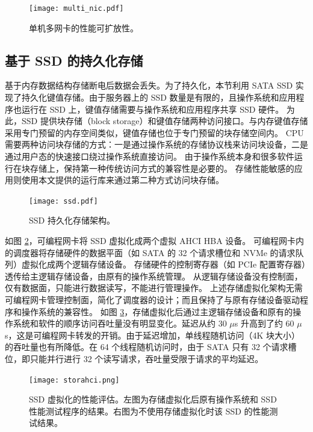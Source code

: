 \begin{figure}[htbp]
	\centering
	\texttt{[image: multi\_nic.pdf]}
	\caption{单机多网卡的性能可扩放性。}
	\label{kvdirect:fig:multiple-nics}
\end{figure}


\subsection{基于 SSD 的持久化存储}

基于内存数据结构存储断电后数据会丢失。为了持久化，本节利用 SATA SSD 实现了持久化键值存储。由于服务器上的 SSD 数量是有限的，且操作系统和应用程序也运行在 SSD 上，键值存储需要与操作系统和应用程序共享 SSD 硬件。
为此，SSD 提供块存储（block storage）和键值存储两种访问接口。与内存键值存储采用专门预留的内存空间类似，键值存储也位于专门预留的块存储空间内。
CPU 需要两种访问块存储的方式：一是通过操作系统的存储协议栈来访问块设备，二是通过用户态的快速接口绕过操作系统直接访问。
由于操作系统本身和很多软件运行在块存储上，保持第一种传统访问方式的兼容性是必要的。
存储性能敏感的应用则使用本文提供的运行库来通过第二种方式访问块存储。


\begin{figure}[htbp]
	\centering
	\texttt{[image: ssd.pdf]}
	\caption{SSD 持久化存储架构。}
	\label{kvdirect:fig:ssd}
\end{figure}

如图 \ref{kvdirect:fig:ssd}，可编程网卡将 SSD 虚拟化成两个虚拟 AHCI HBA 设备。
可编程网卡内的调度器将存储硬件的数据平面（如 SATA 的 32 个请求槽位和 NVMe 的请求队列）虚拟化成两个逻辑存储设备。
存储硬件的控制寄存器（如 PCIe 配置寄存器）透传给主逻辑存储设备，由原有的操作系统管理。
从逻辑存储设备没有控制面，仅有数据面，只能进行数据读写，不能进行管理操作。
上述存储虚拟化架构无需可编程网卡管理控制面，简化了调度器的设计；而且保持了与原有存储设备驱动程序和操作系统的兼容性。
如图 \ref{kvdirect:fig:ssd-benchmark}，存储虚拟化后通过主逻辑存储设备和原有的操作系统和软件的顺序访问吞吐量没有明显变化。延迟从约 30 $\mu$s 升高到了约 60 $\mu$s，这是可编程网卡转发的开销。由于延迟增加，单线程随机访问（4K 块大小）的吞吐量也有所降低。在 64 个线程随机访问时，由于 SATA 只有 32 个请求槽位，即只能并行进行 32 个读写请求，吞吐量受限于请求的平均延迟。


\begin{figure}[htbp]
	\centering
	\texttt{[image: storahci.png]}
	\caption{SSD 虚拟化的性能评估。左图为存储虚拟化后原有操作系统和 SSD 性能测试程序的结果。右图为不使用存储虚拟化时该 SSD 的性能测试结果。}
	\label{kvdirect:fig:ssd-benchmark}
\end{figure}

